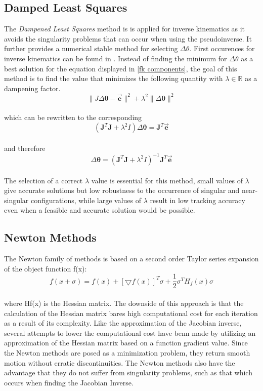 \subsection{Damped Least Squares}
 The \textit{Dampened Least Squares} method is is applied for inverse kinematics as it avoids the singularity problems that can occur when using the pseudoinverse. It further provides a numerical stable method for selecting $\Delta\theta$. First occurences for inverse kinematics can be found in \cite{Wampler.1986,Nakamura.1986}.
Instead of finding the minimum for $\Delta\theta$ as a best solution for the equation displayed in \ref{fk components}, the goal of this method is to find the value that minimizes the following quantity with $\lambda \in \mathbb{R} $ as a dampening factor.\\
\begin{equation}
\parallel J\Delta\pmb{\theta}-\vec{\pmb{e}}\parallel^{2}+\lambda^{2}\parallel\Delta\pmb{\theta}\parallel^{2}
\end{equation}
\\which can be rewritten to the corresponding \\
\begin{equation}
(\pmb{J}^{T}\pmb{J}+\lambda^{2}I)\Delta\pmb{\theta}=\pmb{J}^{T}\vec{\pmb{e}}
\end{equation}
\\and therefore\\
\begin{equation}
\Delta\pmb{\theta}=(\pmb{J}^{T}\pmb{J}+\lambda^{2}I)^{-1}\pmb{J}^{T}\vec{\pmb{e}}
\end{equation}
\\The selection of a correct $\lambda$ value is essential for this method, small values of $\lambda$ give accurate solutions but low robustness to the occurrence of singular and near-singular configurations, while large  values of $\lambda$ result in low tracking accuracy even when a feasible and accurate solution would be possible\cite{Chiaverini.1994,AndreasAristidouandJoanLasenby.2009}.

\subsection{Newton Methods}
The Newton family of methods is based on a second order Taylor series expansion of the object function f(x):\\
\begin{equation}
f(x+\sigma)= f(x)+ [\bigtriangledown f(x)]^{T}\sigma + \frac{1}{2}\sigma^{T}H_{f}(x)\sigma
\end{equation}
\\where Hf(x) is the Hessian matrix. The downside of this approach is that the calculation of the Hessian matrix bares high computational cost for each iteration as a result of its complexity. Like the approximation of the Jacobian inverse, several attempts to lower the computational cost have benn made by utilizing an approximation of the Hessian matrix based on a function gradient value.
Since the Newton methods are posed as a minimization problem, they return smooth motion without erratic discontinuities.
The Newton methods also have the advantage that they do not suffer from singularity problems, such as that which occurs when finding the Jacobian Inverse.
\newpage
